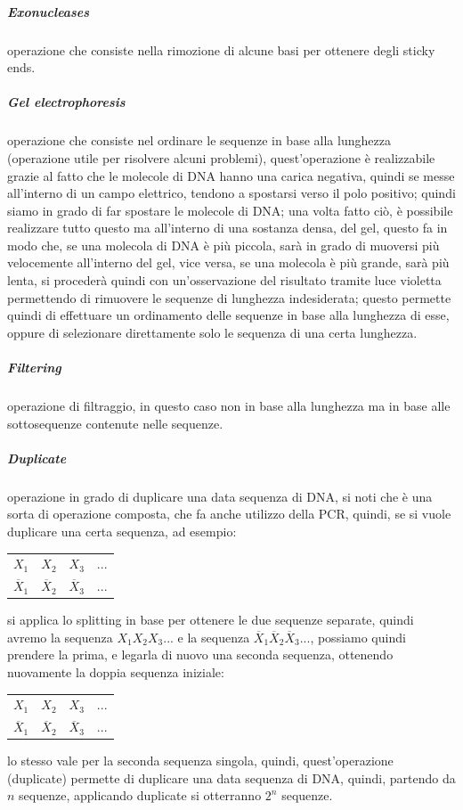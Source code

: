 \documentclass[12pt,a4paper]{report}
\begin{document}
\subparagraph{Exonucleases}
operazione che consiste nella rimozione di alcune basi per ottenere degli sticky ends.

\subparagraph{Gel electrophoresis}
operazione che consiste nel ordinare le sequenze in base alla lunghezza (operazione utile per risolvere alcuni problemi), quest'operazione è realizzabile grazie al fatto che le molecole di DNA hanno una carica negativa, quindi se messe all'interno di un campo elettrico, tendono a spostarsi verso il polo positivo; quindi siamo in grado di far spostare le molecole di DNA; una volta fatto ciò, è possibile realizzare tutto questo ma all'interno di una sostanza densa, del gel, questo fa in modo che, se una molecola di DNA è più piccola, sarà in grado di muoversi più velocemente all'interno del gel, vice versa, se una molecola è più grande, sarà più lenta, si procederà quindi con un'osservazione del risultato tramite luce violetta permettendo di rimuovere le sequenze di lunghezza indesiderata; questo permette quindi di effettuare un ordinamento delle sequenze in base alla lunghezza di esse, oppure di selezionare direttamente solo le sequenza di una certa lunghezza.

\subparagraph{Filtering}
operazione di filtraggio, in questo caso non in base alla lunghezza ma in base alle sottosequenze contenute nelle sequenze.

\subparagraph{Duplicate}
operazione in grado di duplicare una data sequenza di DNA, si noti che è una sorta di operazione composta, che fa anche utilizzo della PCR, quindi, se si vuole duplicare una certa sequenza, ad esempio: 
\begin{center}
\begin{tabular}{ c c c c }
 $X_{1}$ & $X_{2}$ & $X_{3}$ & ... \\ 
 $\overline{X}_{1}$ & $\overline{X}_{2}$ & $\overline{X}_{3}$ & ...
\end{tabular}
\end{center}
si applica lo splitting in base per ottenere le due sequenze separate, quindi avremo la sequenza $X_{1} X_{2} X_{3} ...$ e la sequenza $\overline{X}_{1} \overline{X}_{2} \overline{X}_{3} ...$, possiamo quindi prendere la prima, e legarla di nuovo una seconda sequenza, ottenendo nuovamente la doppia sequenza iniziale:
\begin{center}
\begin{tabular}{ c c c c }
 $X_{1}$ & $X_{2}$ & $X_{3}$ & ... \\ 
 $\overline{X}_{1}$ & $\overline{X}_{2}$ & $\overline{X}_{3}$ & ...
\end{tabular}
\end{center}
lo stesso vale per la seconda sequenza singola, quindi, quest'operazione (duplicate) permette di duplicare una data sequenza di DNA, quindi, partendo da $n$ sequenze, applicando duplicate si otterranno $2^{n}$ sequenze.
\end{document}
